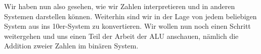 Wir haben nun also gesehen, wie wir Zahlen interpretieren und in anderen Systemen darstellen können. Weiterhin sind wir
in der Lage von jedem beliebigen System aus ins 10er-System zu konvertieren. Wir wollen nun noch einen Schritt weitergehen
und uns einen Teil der Arbeit der \gls{ALU} anschauen, nämlich die Addition zweier Zahlen im binären System.

\newpage
\subsection{\solutionsname}
\loadSolutions